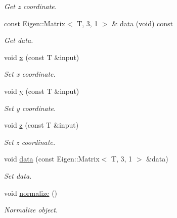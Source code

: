 \begin{DoxyCompactItemize}
\begin{DoxyCompactList}\small\item\em Get z coordinate. \end{DoxyCompactList}\item 
\mbox{\label{classddd_1_1vector_a6d11c684bb82ca9f62973305048b601b}} 
const Eigen\+::\+Matrix$<$ T, 3, 1 $>$ \& \hyperlink{classddd_1_1vector_a6d11c684bb82ca9f62973305048b601b}{data} (void) const
\begin{DoxyCompactList}\small\item\em Get data. \end{DoxyCompactList}\item 
void \hyperlink{classddd_1_1vector_a3a431ffa7d2681cf26f6b2dd5052de65}{x} (const T \&input)
\begin{DoxyCompactList}\small\item\em Set x coordinate. \end{DoxyCompactList}\item 
void \hyperlink{classddd_1_1vector_a516506aadad05ec33fca8e01a63ab19f}{y} (const T \&input)
\begin{DoxyCompactList}\small\item\em Set y coordinate. \end{DoxyCompactList}\item 
void \hyperlink{classddd_1_1vector_a998ea9276d8f3c706b98d4eab9ebcaf3}{z} (const T \&input)
\begin{DoxyCompactList}\small\item\em Set z coordinate. \end{DoxyCompactList}\item 
void \hyperlink{classddd_1_1vector_a207ab0fdad2166078057b772edce8d0e}{data} (const Eigen\+::\+Matrix$<$ T, 3, 1 $>$ \&data)
\begin{DoxyCompactList}\small\item\em Set data. \end{DoxyCompactList}\item 
\mbox{\label{classddd_1_1vector_aeff69a088496a7c9295b30b1c928df70}} 
void \hyperlink{classddd_1_1vector_aeff69a088496a7c9295b30b1c928df70}{normalize} ()
\begin{DoxyCompactList}\small\item\em Normalize object. \end{DoxyCompactList}\item 
\mbox{\label{classddd_1_1vector_a77aea495c4aeaf8645d4ef94d1a0afb2}} 

\end{DoxyCompactItemize}
